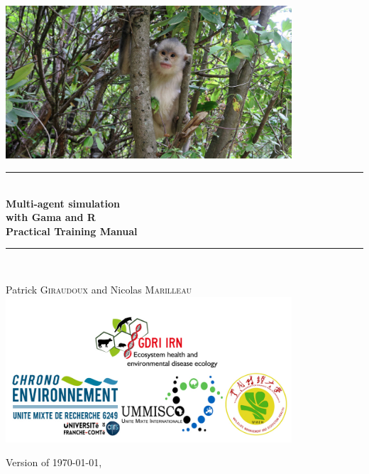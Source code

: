 \documentclass[a4paper,12pt]{book}
\begin{document}

\begin{titlepage}
\begin{center}

\includegraphics[width=0.8\textwidth]{IMG_1597b}\\[0.5cm]


\rule{\linewidth}{0.5mm} \\[0.3cm]
{ \huge \bfseries Multi-agent simulation\\with Gama and R \\[0.3cm]
\Large Practical Training Manual}\\[0.3cm]
\rule{\linewidth}{0.5mm} \\[0.5cm]


\noindent

\large Patrick \textsc{Giraudoux} and  Nicolas \textsc{Marilleau}\\[0.5cm]

\includegraphics[width=0.8\textwidth]{Logos}\\[0.5cm]

\vfill

{\small Version of \today, \currenttime}


\end{center}
\end{titlepage}
\end{document}
